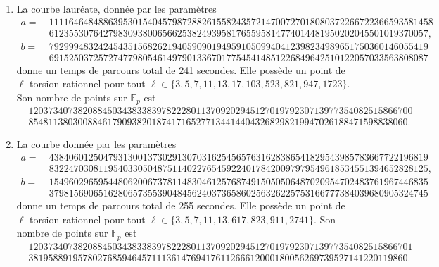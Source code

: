 \documentclass[11pt,a4paper]{article}
\newcommand{\F}{\mathbb{F}}
\theoremstyle{definition}
\begin{document}
\begin{enumerate}

\item La courbe lauréate, donnée par les paramètres
$$\begin{aligned}
a =\ & 111164648488639530154045798728826155824357214700727018080372266722366593581458 \\
&61235530764279830938006566253824939581765595814774014481950202045501019370057,\\
b =\ & 79299948324245435156826219405909019495910509940412398234989651750360146055419 \\
&69152503725727477980546149790133670177545414851226849642510122057033563808087
\end{aligned}$$
donne un temps de parcours total de 241 secondes. Elle possède un point de $\ell$-torsion rationnel pour tout $\ell\in\{3, 5, 7, 11, 13, 17, 103, 523, 821, 947, 1723\}$. Son nombre de points sur $\F_p$ est
$$\begin{aligned}
&120373407382088450343833839782228011370920294512701979230713977354082515866700 \\
&85481138030088461790938201874171652771344144043268298219947026188471598838060.
\end{aligned}$$

\item La courbe donnée par les paramètres
$$\begin{aligned}
a =\ & 43840601250479313001373029130703162545657631628386541829543985783667722196819 \\
& 83224703081195403305048751140227654592240178420097979549618534551394652828125,\\
b =\ & 15496029659544806200673781148304612576874915050506487020954702483761967446835\\
& 37981569065162806573553904845624037365860256326225753166777384039680905324745
\end{aligned}$$
donne un temps de parcours total de 255 secondes. Elle possède un point de $\ell$-torsion rationnel pour tout $\ell\in\{3, 5, 7, 11, 13, 617, 823, 911, 2741\}$. Son nombre de points sur $\F_p$ est
$$\begin{aligned}
&120373407382088450343833839782228011370920294512701979230713977354082515866701 \\
&38195889195780276859464571113614769417611266612000180056269739527141220119860.
\end{aligned}$$


\end{enumerate}
\end{document}
